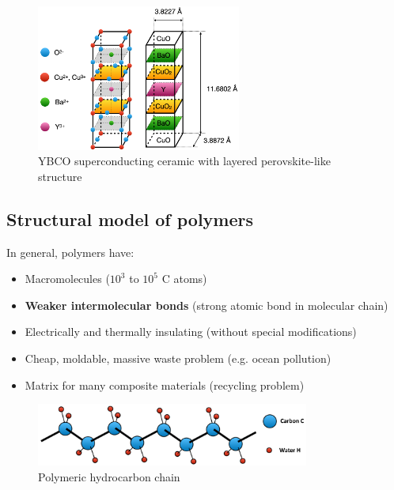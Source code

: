 \documentclass{article}
\begin{document}
\begin{figure}[ht!]
  \centering
  \includegraphics[width=0.6\textwidth]{media/ceramic_structure.png}
  \caption*{YBCO superconducting ceramic with layered perovskite-like structure}
\end{figure}

\subsection{Structural model of polymers}
In general, polymers have:
\begin{itemize}
  \item Macromolecules ($10^3$ to $10^5$ C atoms)
  \item \textbf{Weaker intermolecular bonds} (strong atomic bond in molecular chain)
  \item Electrically and thermally insulating (without special modifications)
  \item Cheap, moldable, massive waste problem (e.g. ocean pollution)
  \item Matrix for many composite materials (recycling problem)
\end{itemize}
\begin{figure}[ht!]
  \centering
  \includegraphics[width=0.8\textwidth]{media/polymer_structure.png}
  \caption*{Polymeric hydrocarbon chain}
\end{figure}
\end{document}

